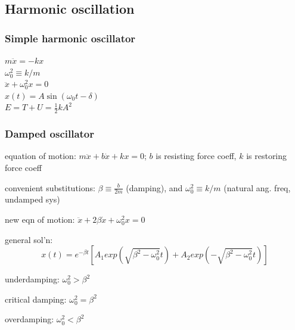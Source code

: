 \documentclass[letterpaper,landscape,10pt]{article}
\newenvironment{mydescription}
{\begin{description}
	\setlength{\itemsep}{0pt}
	\setlength{\parskip}{0pt}
	\setlength{\parsep}{-1pt}}
{\end{description}}
\begin{document}
{\begin{multicols}{4}
\begin{mydescription}
			\end{mydescription}
	

    \subsection*{Harmonic oscillation}
    \subsubsection*{Simple harmonic oscillator}
    	{\centering
    	$m\ddot{x} = -kx$  \\
    	$\omega_0^2 \equiv k/m$  \\
    	$\ddot{x} + \omega_0^2x = 0$  \\
    	$x(t) = A\sin (\omega_0 t - \delta)$  \\
    	$E = T + U = \frac{1}{2}kA^2$ \\
    
    	}
    
    \subsubsection*{Damped oscillator}
    	\begin{mydescription}
    		\item[equation of motion:]
    			$m\ddot{x} + b\dot{x} + kx = 0$; $b$ is resisting force coeff,
    			$k$ is restoring force coeff  \\
    		\item[convenient substitutions:]
    			$\beta \equiv \frac{b}{2m}$ (damping), and $\omega_0^2 \equiv
    			k/m$ (natural ang. freq, undamped sys)  \\
    		\item[new eqn of motion:]
    			$\ddot{x} + 2\beta\dot{x} + \omega_0^2x = 0$  \\
    		\item[general sol'n:]
    			$$
    				x(t) = e^{-\beta t}\left[ A_1exp\left(
    				\sqrt{\beta^2-\omega_0^2}t\right) + A_2exp\left(
    				-\sqrt{\beta^2-\omega_0^2}t\right) \right]
    			$$
    		\item[underdamping:]
    			$\omega_0^2 > \beta^2$  \\
    		\item[critical damping:]
    			$\omega_0^2 = \beta^2$  \\
    		\item[overdamping:]
    			$\omega_0^2 < \beta^2$  \\
    	\end{mydescription}
    

\end{multicols}}
\end{document}
